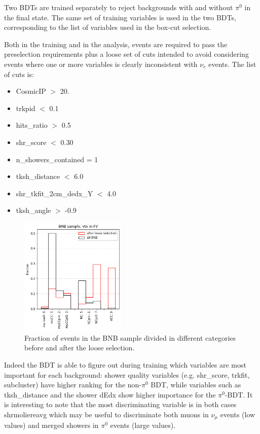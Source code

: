 \documentclass[a4paper]{article}
\begin{document}
Two BDTs are trained separately to reject backgrounds with and without $\pi^0$ in the final state. The same set of training variables is used in the two BDTs, corresponding to the list of variables used in the box-cut selection. 

Both in the training and in the analysis, events are required to pass the preselection requirements plus a loose set of cuts intended to avoid considering events where one or more variables is clearly inconsistent with $\nu_e$ events. The list of cuts is:
\begin{itemize}
    \item CosmicIP $>$ 20.
    \item trkpid $<$ 0.1
    \item hits\_ratio $>$ 0.5
    \item shr\_score $<$ 0.30
    \item n\_showers\_contained = 1
    \item tksh\_distance $<$ 6.0
    \item shr\_tkfit\_2cm\_dedx\_Y $<$ 4.0
    \item tksh\_angle $>$ -0.9
\end{itemize}

\begin{figure}[H]
\begin{center}
\includegraphics[width=0.45\textwidth]{1eNp/loose_sel_perf.png}
\caption{\label{fig:1eNp:loosesel} Fraction of events in the BNB sample divided in different categories before and after the loose selection.}
\end{center}
\end{figure}

Indeed the BDT is able to figure out during training which variables are most important for each background: shower quality variables (e.g. shr\_score, trkfit, subcluster) have higher ranking for the non-$\pi^0$ BDT, while variables such as tksh\_distance and the shower dEdx show higher importance for the $\pi^0$-BDT. It is interesting to note that the most discriminating variable is in both cases shrmoliereavg which may be useful to discriminate both muons in $\nu_\mu$ events (low values) and merged showers in $\pi^0$ events (large values).
\end{document}
